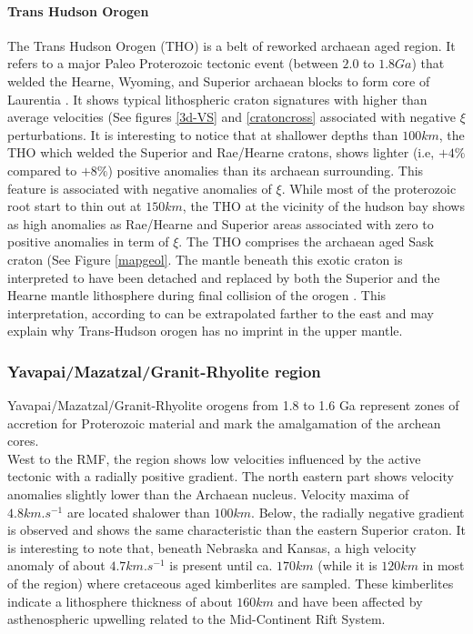 \documentclass[12pt]{article}
\begin{document}
		\paragraph{Trans Hudson Orogen}
			The Trans Hudson Orogen (THO) is a belt of reworked archaean aged region. It refers to a major Paleo Proterozoic tectonic event (between $2.0$ to $1.8Ga$) that welded the Hearne, Wyoming, and Superior archaean blocks to form core of Laurentia \citep{hoffman1988united,whitmeyer2007tectonic}.
			It shows typical lithospheric craton signatures with higher than average velocities (See figures \ref{3d-VS} and \ref{cratoncross} associated with negative $\xi$ perturbations. 
			It is interesting to notice that at shallower depths than $100km$, the THO which welded the Superior and Rae/Hearne cratons, shows lighter (i.e, $+4\%$ compared to $+8\%$) positive anomalies than its archaean surrounding. This feature is associated with negative anomalies of $\xi$. While most of the proterozoic root start to thin out at $150km$, the THO at the vicinity of the hudson bay shows as high anomalies as Rae/Hearne and Superior areas associated with zero to positive anomalies in term of $\xi$. 
			The THO comprises the archaean aged Sask craton (See Figure \ref{mapgeol}. 
			The mantle beneath this exotic craton is interpreted to have been detached and replaced by both the Superior and the Hearne mantle lithosphere during final collision of the orogen \citep{nemeth2005lithospheric}. 
			This interpretation, according to \cite{faure2011seismic} can be extrapolated farther to the east and may explain why Trans-Hudson orogen has no imprint in the upper mantle.
			
	\subsubsection{Yavapai/Mazatzal/Granit-Rhyolite region}

		Yavapai/Mazatzal/Granit-Rhyolite orogens from 1.8 to 1.6 Ga represent zones of accretion for Proterozoic material and mark the amalgamation of the archean cores. \citep{hoffman1988united} \\
		West to the RMF, the region shows low velocities influenced by the active tectonic with a radially positive gradient. 
		The north eastern part shows velocity anomalies slightly lower than the Archaean nucleus. Velocity maxima of $4.8km.s^{-1}$ are located shalower than $100km$. 
		Below, the radially negative gradient is observed and shows the same characteristic than the eastern Superior craton. It is interesting to note that, beneath Nebraska and Kansas, a high velocity anomaly of about $4.7km.s^{-1}$ is present until ca. $170km$ (while it is $120km$ in most of the region) where cretaceous aged kimberlites are sampled. 
		These kimberlites indicate a lithosphere thickness of about $160km$ and have been affected by asthenospheric upwelling related to the Mid-Continent Rift System. \citep{griffin2004lithosphere}
\end{document}
